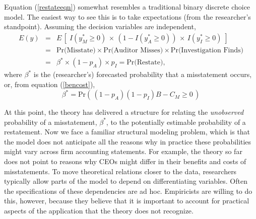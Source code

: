 Equation (\ref{restateeqn}) somewhat resembles a traditional binary discrete choice model. The easiest
way to see this is to take expectations (from the researcher's standpoint).
Assuming the decision variables are independent,
\begin{equation} \label{equilpr}
\begin{array}{lcl}
 E(y) & = & E\, \left[\; I(y^*_M \ge 0) \, \times\, (1 - I(y^*_A \ge 0)) \, \times\, I(y^*_I \ge 0) \; \right]\\[1em]
 & = &  \mbox{Pr(Misstate)} \times \mbox{Pr(Auditor Misses)} \times
\mbox{Pr(Investigation Finds)}\\[1em]
& = & \beta^* \times (1-p_A) \times p_{I} = \mbox{Pr(Restate)} ,
\end{array}\end{equation}
where $\beta^*$ is the (researcher's) forecasted probability that a misstatement occurs, or, from equation (\ref{bencost}),
\begin{equation}\label{betaplus}
\beta^*= \mbox{Pr}\left(\, (1 - p_A)(1 - p_I) B - C_M \ge 0 \,\right)
\end{equation}

At this point, the theory has delivered a structure for relating the \emph{unobserved} probability of a misstatement, $\beta^*$, to the potentially estimable probability of a restatement.
Now we face a familiar structural modeling problem, which is that the model does not anticipate all the reasons why in practice these probabilities might vary across firm accounting statements.
For example, the theory so far does not point to reasons why CEOs might differ in their benefits and costs of misstatements. 
To move theoretical relations closer to the data, researchers typically allow parts of the model to depend on differentiating variables.
Often the specifications of these dependencies are ad hoc. 
Empiricists are willing to do this, however, because they believe that it is important to account for practical aspects of the application that the theory does not recognize.


